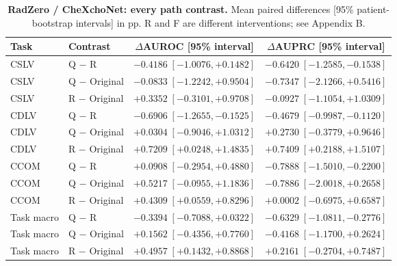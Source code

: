 \begin{table}[tp]
\centering
\caption{\textbf{RadZero / CheXchoNet: every path contrast.} Mean paired differences [95\% patient-bootstrap intervals] in pp. R and F are different interventions; see Appendix B.}
\label{tab:supp-cardiac-path-ci-radzero}
\small
\setlength{\tabcolsep}{4pt}
\begin{tabular*}{\textwidth}{@{\extracolsep{\fill}}llcc@{}}
\toprule
Task & Contrast & $\Delta$AUROC [95\% interval] & $\Delta$AUPRC [95\% interval] \\
\midrule
CSLV & Q $-$ R & $-0.4186\;[-1.0076,+0.1482]$ & $-0.6420\;[-1.2585,-0.1538]$ \\
CSLV & Q $-$ Original & $-0.0833\;[-1.2242,+0.9504]$ & $-0.7347\;[-2.1266,+0.5416]$ \\
CSLV & R $-$ Original & $+0.3352\;[-0.3101,+0.9708]$ & $-0.0927\;[-1.1054,+1.0309]$ \\
CDLV & Q $-$ R & $-0.6906\;[-1.2655,-0.1525]$ & $-0.4679\;[-0.9987,-0.1120]$ \\
CDLV & Q $-$ Original & $+0.0304\;[-0.9046,+1.0312]$ & $+0.2730\;[-0.3779,+0.9646]$ \\
CDLV & R $-$ Original & $+0.7209\;[+0.0248,+1.4835]$ & $+0.7409\;[+0.2188,+1.5107]$ \\
CCOM & Q $-$ R & $+0.0908\;[-0.2954,+0.4880]$ & $-0.7888\;[-1.5010,-0.2200]$ \\
CCOM & Q $-$ Original & $+0.5217\;[-0.0955,+1.1836]$ & $-0.7886\;[-2.0018,+0.2658]$ \\
CCOM & R $-$ Original & $+0.4309\;[+0.0559,+0.8296]$ & $+0.0002\;[-0.6975,+0.6587]$ \\
Task macro & Q $-$ R & $-0.3394\;[-0.7088,+0.0322]$ & $-0.6329\;[-1.0811,-0.2776]$ \\
Task macro & Q $-$ Original & $+0.1562\;[-0.4356,+0.7760]$ & $-0.4168\;[-1.1700,+0.2624]$ \\
Task macro & R $-$ Original & $+0.4957\;[+0.1432,+0.8868]$ & $+0.2161\;[-0.2704,+0.7487]$ \\
\bottomrule
\end{tabular*}
\end{table}

